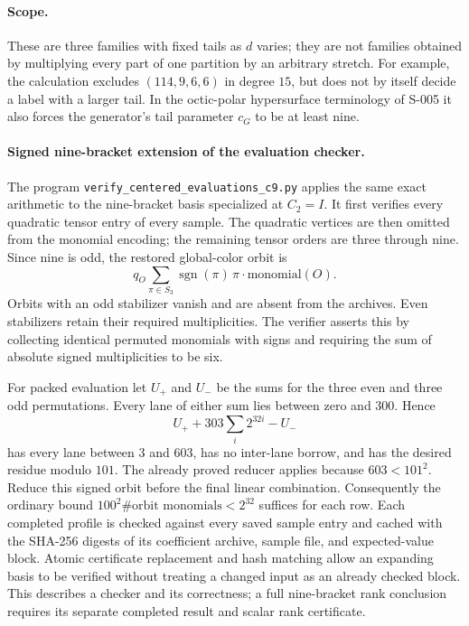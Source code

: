 \paragraph{Scope.}
These are three families with fixed tails as $d$ varies; they are not
families obtained by multiplying every part of one partition by an
arbitrary stretch. For example, the calculation excludes
$(114,9,6,6)$ in degree $15$, but does not by itself decide a label
with a larger tail. In the octic-polar hypersurface terminology of
S-005 it also forces the generator's tail parameter $c_G$ to be at
least nine.

\paragraph{Signed nine-bracket extension of the evaluation checker.}
The program \texttt{verify\_centered\_evaluations\_c9.py} applies the same
exact arithmetic to the nine-bracket basis specialized at $C_2=I$.
It first verifies every quadratic tensor entry of every sample.
The quadratic vertices are then omitted from the monomial encoding;
the remaining tensor orders are three through nine.  Since nine is
odd, the restored global-color orbit is
\[
 q_O\sum_{\pi\in S_3}\operatorname{sgn}(\pi)\,
                    \pi\cdot\text{monomial}(O).
\]
Orbits with an odd stabilizer vanish and are absent from the archives.
Even stabilizers retain their required multiplicities.  The verifier
asserts this by collecting identical permuted monomials with signs
and requiring the sum of absolute signed multiplicities to be six.

For packed evaluation let $U_+$ and $U_-$ be the sums for the three
even and three odd permutations.  Every lane of either sum lies
between zero and $300$.  Hence
\[
               U_+ +303\sum_i2^{32i}-U_-
\]
has every lane between $3$ and $603$, has no inter-lane borrow,
and has the desired residue modulo $101$.  The already proved
reducer applies because $603<101^2$.  Reduce this signed orbit
before the final linear combination.  Consequently the ordinary
bound $100^2\#\text{orbit monomials}<2^{32}$ suffices for each row.
Each completed profile is checked against every saved sample entry
and cached with the SHA-256 digests of its coefficient archive,
sample file, and expected-value block.  Atomic certificate replacement
and hash matching allow an expanding basis to be verified without
treating a changed input as an already checked block.
This describes a checker and its correctness; a full nine-bracket
rank conclusion requires its separate completed result and scalar
rank certificate.

